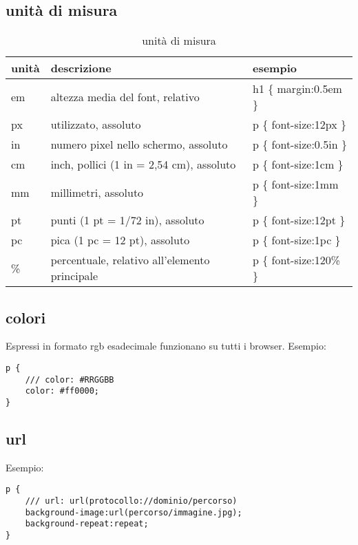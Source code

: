 \documentclass[11pt]{article}
\begin{document}
\subsection{unità di misura}
\begin{table}[H]
	\centering
	\begin{tabular}{|l|l|l|}
		\hline
		unità & descrizione & esempio \\
		\hline
		em & altezza media del font, relativo & h1 \{ margin:0.5em \} \\
		px & utilizzato, assoluto & p \{ font-size:12px \} \\
		in & numero pixel nello schermo, assoluto & p \{ font-size:0.5in \} \\
		cm & inch, pollici (1 in = 2,54 cm), assoluto & p \{ font-size:1cm \} \\
		mm & millimetri, assoluto & p \{ font-size:1mm \} \\
		pt & punti (1 pt = 1/72 in), assoluto & p \{ font-size:12pt \} \\
		pc & pica (1 pc = 12 pt), assoluto & p \{ font-size:1pc \} \\
		\% & percentuale, relativo all'elemento principale & p \{ font-size:120\% \} \\
		\hline
	\end{tabular}
	\caption{unità di misura}
\end{table}

\subsection{colori}
Espressi in formato rgb esadecimale funzionano su tutti i browser.
Esempio:
\begin{lstlisting}
p {
	/// color: #RRGGBB
	color: #ff0000;
}
\end{lstlisting}

\subsection{url}
Esempio:
\begin{lstlisting}
p {
	/// url: url(protocollo://dominio/percorso)
	background-image:url(percorso/immagine.jpg);
	background-repeat:repeat;
}
\end{lstlisting}
\end{document}
